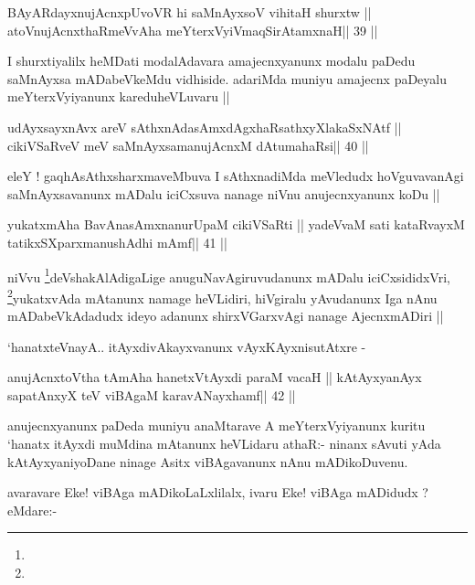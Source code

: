 \begin{shl}
BAyARdayxnujAcnxpUvoVR hi saMnAyxsoV vihitaH shurxtw ||
atoV\s nujAcnxthaRmeVvA\s\s ha meYterxVyiVmaqSirAtamxnaH\hfill || 39 ||
\end{shl}

\begin{artha}
I shurxtiyalilx heMDati modalAdavara amajecnxyanunx modalu paDedu
saMnAyxsa mADabeVkeMdu vidhiside. adariMda muniyu amajecnx paDeyalu
meYterxVyiyanunx kareduheVLuvaru ||
\end{artha}

\begin{shl}
udAyxsayxnAvx areV sAthxnAdasAmxdAgxhaRsathxyXlakaSxNAtf ||
cikiVSaRveV meV saMnAyxsamanujAcnxM dAtumahaRsi\hfill || 40 ||
\end{shl}

\begin{artha}
eleY ! gaqhAsAthxsharxmaveMbuva I sAthxnadiMda meVledudx hoVguvavanAgi
saMnAyxsavanunx mADalu iciCxsuva nanage niVnu anujecnxyanunx koDu ||
\end{artha}

\begin{shl}
yukatxmAha BavAnasAmxnanurUpaM cikiVSaRti ||
yadeVvaM sati kataRvayxM tatikxSXparxmanushAdhi mAmf\hfill || 41 ||
\end{shl}

\begin{artha}
niVvu \footnote[2]{}deVshakAlAdigaLige anuguNavAgiruvudanunx mADalu
iciCxsididxVri, \footnote[1]{}yukatxvAda mAtanunx namage heVLidiri,
hiVgiralu yAvudanunx Iga nAnu mADabeVkAdadudx ideyo adanunx
shirxVGarxvAgi nanage AjecnxmADiri ||

`hanatxteV\s nayA.. itAyxdivAkayxvanunx vAyxKAyxnisutAtxre -
\end{artha}

\begin{shl}
anujAcnxtoV\s tha tAmAha hanetxVtAyxdi paraM vacaH ||
kAtAyxyanAyx sapatAnxyX teV viBAgaM karavANayxhamf\hfill || 42 ||
\end{shl}

\begin{artha}
anujecnxyanunx paDeda muniyu anaMtarave A meYterxVyiyanunx kuritu
`hanatx itAyxdi muMdina mAtanunx heVLidaru athaR:- ninanx sAvuti yAda
kAtAyxyaniyoDane ninage Asitx viBAgavanunx nAnu mADikoDuvenu.

avaravare Eke! viBAga mADikoLaLxlilalx, ivaru Eke! viBAga mADidudx ?
eMdare:-
\end{artha}

